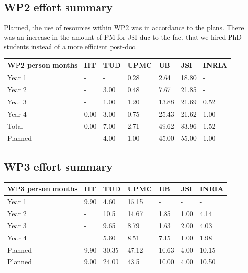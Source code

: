 \documentclass[12pt,a4paper,twoside]{article}
\begin{document}
\subsection{WP2 effort summary}
Planned, the use of resources within WP2 was in accordance to the plans. There was an increase in the amount of PM for JSI due to the fact that we hired PhD students instead of a more efficient post-doc.
\begin{center}
\begin{tabular}{|C{1.5cm}|C{1.5cm}|C{1.5cm}|C{2cm}|C{2cm}|C{2cm}|C{2cm}|}
\hline
\footnotesize \textbf{WP2 person months}& \footnotesize \textbf{IIT}&\footnotesize \textbf{TUD}&\footnotesize \textbf{UPMC}& \footnotesize \textbf{UB} &\footnotesize \textbf{JSI} & \footnotesize \textbf{INRIA} \\ \hline
\footnotesize Year 1  &  -     & -    & 0.28 & 2.64  & 18.80  & -     \\  \hline
\footnotesize Year 2  &  -     & 3.00 & 0.48 & 7.67  & 21.85  & -     \\  \hline
\footnotesize Year 3  &  -     & 1.00 & 1.20 & 13.88 & 21.69  & 0.52  \\  \hline
\footnotesize Year 4  &  0.00  &  3.00 &  0.75 &  25.43 &  21.62 &  1.00  \\  \hline 
\footnotesize Total & 0.00 &  7.00 &  2.71 &  49.62 &  83.96 &  1.52     \\
\hline \hline
\footnotesize Planned & -      & 4.00 & 1.00 & 45.00  & 55.00 & 1.00  \\  \hline
\end{tabular}
\end{center}

\subsection{WP3 effort summary}
\begin{center}
\begin{tabular}{|C{1.5cm}|C{1.5cm}|C{1.5cm}|C{2cm}|C{2cm}|C{2cm}|C{2cm}|}
\hline
\footnotesize \textbf{WP3 person months} & \footnotesize \textbf{IIT}&\footnotesize \textbf{TUD}&\footnotesize \textbf{UPMC}& \footnotesize \textbf{UB} &\footnotesize \textbf{JSI} &\footnotesize \textbf{INRIA} \\ \hline
\footnotesize Year 1  &  9.90 & 4.60  & 15.15 & -    & -    &  -   \\  \hline
\footnotesize Year 2  &  -    & 10.5  & 14.67 & 1.85 & 1.00 & 4.14  \\  \hline
\footnotesize Year 3  &  -    & 9.65  & 8.79  & 1.63 & 2.00 & 4.03 \\  \hline
\footnotesize Year 4  & -     &  5.60 &  8.51 &  7.15  &  1.00  &  1.98    \\    \hline
\footnotesize Planned & 9.90 &  30.35 &  47.12 &  10.63 &  4.00 &  10.15    \\
\hline \hline
\footnotesize Planned &  9.00 & 24.00 & 43.5 & 10.00 & 4.00 & 10.50 \\ \hline
\end{tabular}
\end{center}
\end{document}
